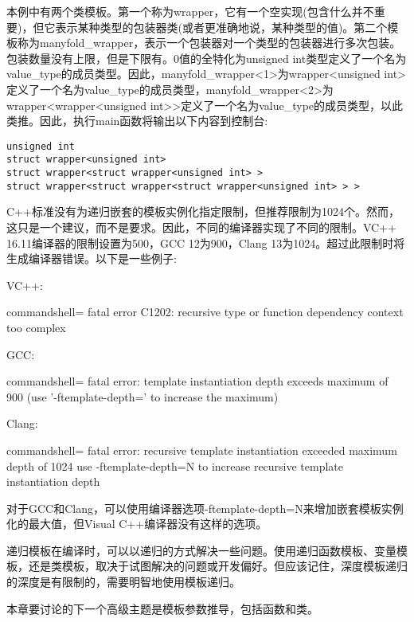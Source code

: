 本例中有两个类模板。第一个称为wrapper，它有一个空实现(包含什么并不重要)，但它表示某种类型的包装器类(或者更准确地说，某种类型的值)。第二个模板称为manyfold\_wrapper，表示一个包装器对一个类型的包装器进行多次包装。包装数量没有上限，但是下限有。0值的全特化为unsigned int类型定义了一个名为value\_type的成员类型。因此，manyfold\_wrapper<1>为wrapper<unsigned int>定义了一个名为value\_type的成员类型，manyfold\_wrapper<2>为wrapper<wrapper<unsigned int>>定义了一个名为value\_type的成员类型，以此类推。因此，执行main函数将输出以下内容到控制台:

\begin{lstlisting}[style=styleCXX]
unsigned int
struct wrapper<unsigned int>
struct wrapper<struct wrapper<unsigned int> >
struct wrapper<struct wrapper<struct wrapper<unsigned int> > >
\end{lstlisting}

C++标准没有为递归嵌套的模板实例化指定限制，但推荐限制为1024个。然而，这只是一个建议，而不是要求。因此，不同的编译器实现了不同的限制。VC++ 16.11编译器的限制设置为500，GCC 12为900，Clang 13为1024。超过此限制时将生成编译器错误。以下是一些例子:

VC++:

\begin{tcblisting}{commandshell={}}
fatal error C1202: recursive type or function dependency
context too complex
\end{tcblisting}

GCC:

\begin{tcblisting}{commandshell={}}
fatal error: template instantiation depth exceeds maximum of
900 (use '-ftemplate-depth=' to increase the maximum)
\end{tcblisting}

Clang:

\begin{tcblisting}{commandshell={}}
fatal error: recursive template instantiation exceeded maximum
depth of 1024
use -ftemplate-depth=N to increase recursive template
instantiation depth
\end{tcblisting}

对于GCC和Clang，可以使用编译器选项-ftemplate-depth=N来增加嵌套模板实例化的最大值，但Visual C++编译器没有这样的选项。

递归模板在编译时，可以以递归的方式解决一些问题。使用递归函数模板、变量模板，还是类模板，取决于试图解决的问题或开发偏好。但应该记住，深度模板递归的深度是有限制的，需要明智地使用模板递归。

本章要讨论的下一个高级主题是模板参数推导，包括函数和类。





